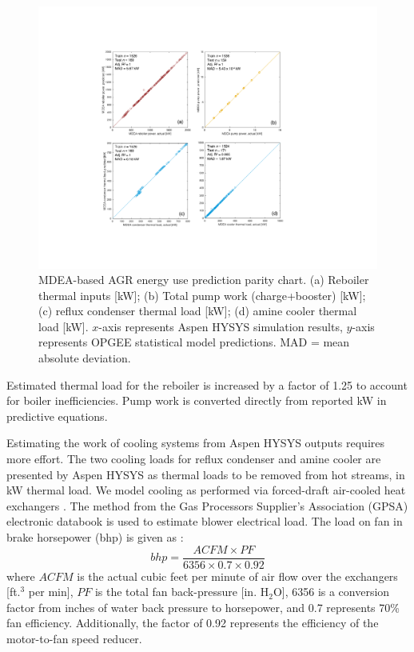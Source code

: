 \documentclass[11pt]{report}
\newcommand{\marg}[1]{{\footnotesize\textit{\textcolor{stanford}{'#1'}}}}
\newcommand{\marginnote}[1]{\marginpar{\marg{#1}}}
\begin{document}
\begin{figure}
\includegraphics[width=1\columnwidth]{images/MDEA_comb.pdf}
\caption{MDEA-based AGR energy use prediction parity chart. (a) Reboiler thermal inputs [kW]; (b) Total pump work (charge+booster) [kW]; (c) reflux condenser thermal load [kW]; (d) amine cooler thermal load [kW]. $x$-axis represents Aspen HYSYS simulation results, $y$-axis represents OPGEE statistical model predictions. MAD = mean absolute deviation.}
\label{fig:AGR_resid_MDEA}
\end{figure}

\clearpage

Estimated thermal load for the reboiler is increased by a factor of 1.25 to account for boiler inefficiencies.\marginnote{Acid Gas Removal 1.2.8} Pump work is converted directly from reported kW in predictive equations. \marginnote{Acid Gas Removal 2.1.8} 

Estimating the work of cooling systems from Aspen HYSYS outputs requires more effort. The two cooling loads for reflux condenser and amine cooler are presented by Aspen HYSYS as thermal loads to be removed from hot streams, in kW thermal load.  We model cooling as performed via forced-draft air-cooled heat exchangers \cite{Manning1991, GPSA2004}.  The method from the Gas Processors Supplier's Association (GPSA) electronic databook is used to estimate blower electrical load. The load on fan in brake horsepower (bhp) is given as \cite[p. 10-17]{GPSA2004}:
\begin{equation}
bhp = \frac{ACFM \times PF}{6356 \times 0.7 \times 0.92}
\end{equation}
where $ACFM$ is the actual cubic feet per minute of air flow over the exchangers [ft.$^3$ per min], $PF$ is the total fan back-pressure [in. H$_2$O], 6356 is a conversion factor from inches of water back pressure to horsepower, and 0.7 represents 70\% fan efficiency.  Additionally, the factor of 0.92 represents the efficiency of the motor-to-fan speed reducer.
\end{document}
